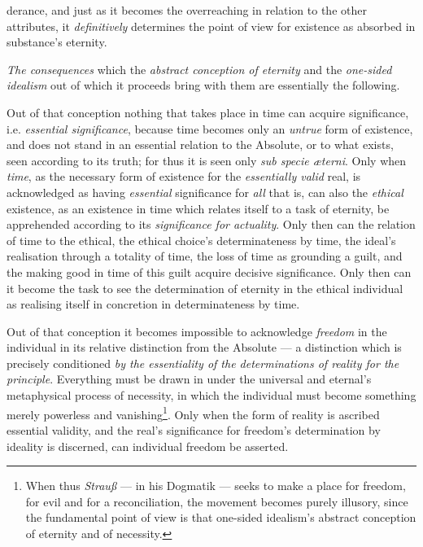 \documentclass[12pt,a4paper]{book}
\begin{document}
\setcounter{footnote}{0}%
derance, and just as it becomes the overreaching in relation to the other
attributes, it \emph{definitively} determines the point of view for existence as
absorbed in substance's eternity.

\emph{The consequences} which the \emph{abstract conception of eternity} and the
\emph{one-sided idealism} out of which it proceeds bring with them are
essentially the following.

Out of that conception nothing that takes place in time can acquire
significance, i.e. \emph{essential significance}, because time becomes only an
\emph{untrue} form of existence, and does not stand in an essential relation to
the Absolute, or to what exists, seen according to its truth; for thus it is
seen only \textit{sub specie æterni}. Only when \emph{time}, as the necessary
form of existence for the \emph{essentially valid} real, is acknowledged as
having \emph{essential} significance for \emph{all} that is, can also the
\emph{ethical} existence, as an existence in time which relates itself to a task
of eternity, be apprehended according to its \emph{significance for actuality}.
Only then can the relation of time to the ethical, the ethical choice's
determinateness by time, the ideal's realisation through a totality of time, the
loss of time as grounding a guilt, and the making good in time of this guilt
acquire decisive significance. Only then can it become the task to see the
determination of eternity in the ethical individual as realising itself in
concretion in determinateness by time.

Out of that conception it becomes impossible to acknowledge \emph{freedom} in
the individual in its relative distinction from the Absolute --- a distinction
which is precisely conditioned \emph{by the essentiality of the determinations
of reality for the principle}. Everything must be drawn in under the universal
and eternal's metaphysical process of necessity, in which the individual must
become something merely powerless and vanishing\footnote{When thus \emph{Strauß}
--- in his Dogmatik --- seeks to make a place for freedom, for evil and for a
reconciliation, the movement becomes purely illusory, since the fundamental
point of view is that one-sided idealism's abstract conception of eternity and
of necessity.}. Only when the form of reality is ascribed essential
validity, and the real's significance for freedom's determination by ideality is
discerned, can individual freedom be asserted.
\end{document}

